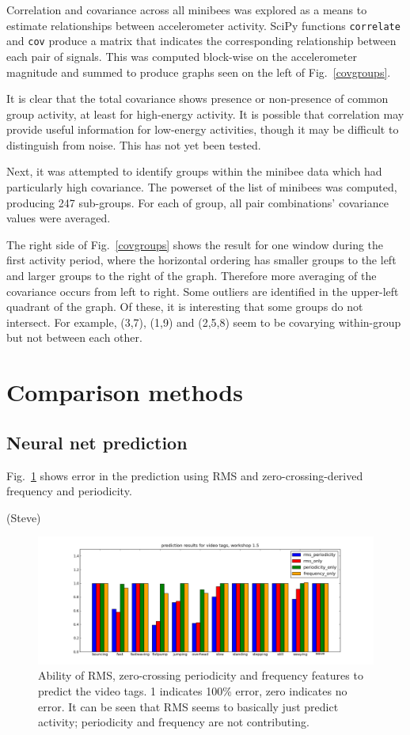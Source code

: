 \documentclass{article}
\newcommand{\func}[1]{\texttt{#1}}
\begin{document}
Correlation and covariance across all minibees was explored as a means
to estimate relationships between accelerometer activity.
SciPy functions \func{correlate} and \func{cov} produce a matrix that
indicates the corresponding relationship between each pair of signals.
This was computed block-wise on the accelerometer magnitude and summed
to produce graphs seen on the left of Fig.~\ref{covgroups}.

It is clear that the total covariance shows presence or non-presence
of common group activity, at least for high-energy activity.
It is possible that correlation may provide useful information for
low-energy activities, though it may be difficult to distinguish from
noise.
This has not yet been tested.

Next, it was attempted to identify groups within the minibee data
which had particularly high covariance.
The powerset of the list of minibees was computed, producing 247
sub-groups.
For each of group, all pair combinations' covariance values were averaged.

The right side of Fig.~\ref{covgroups} shows the result for one window
during the first activity period, where the horizontal ordering has
smaller groups to the left and larger groups to the right of the
graph.
Therefore more averaging of the covariance occurs from left to right.
Some outliers are identified in the upper-left quadrant of the graph.
Of these, it is interesting that some groups do not intersect.
For example, (3,7), (1,9) and (2,5,8) seem to be covarying
within-group but not between each other.

\section{Comparison methods}

\subsection{Neural net prediction}

Fig.~\ref{fig:predresults} shows error in the prediction using RMS and
zero-crossing-derived frequency and periodicity.

(Steve)

\begin{figure}
\centerline{\includegraphics[width=\textwidth]{images/predictionresults.png}}
\caption{Ability of RMS, zero-crossing periodicity and frequency
  features to predict the video tags.  1 indicates 100\% error, zero
  indicates no error.  It can be seen that RMS seems to basically just
  predict activity; periodicity and frequency are not contributing.}
\label{fig:predresults}
\end{figure}
\end{document}
